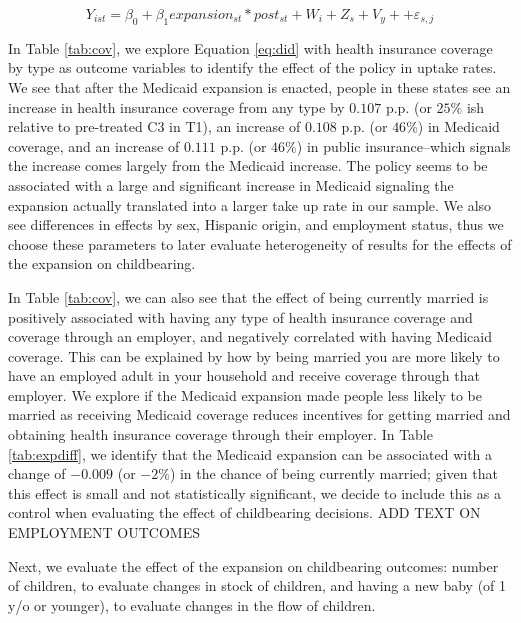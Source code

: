 \documentclass{article}
\begin{document}
\begin{equation}
    \label{eq:did}
    Y_{ist} = \beta_0 + \beta_1 expansion_{st}*post_{st} +  W_{i} + Z_{s} + V_{y}+ + \varepsilon_{s,j}
\end{equation}

In Table \ref{tab:cov}, we explore Equation \ref{eq:did} with health insurance coverage by type as outcome variables to identify the effect of the policy in uptake rates. We see that after the Medicaid expansion is enacted, people in these states see an increase in health insurance coverage from any type by $0.107$ p.p. (or $25\%$ ish relative to pre-treated  C3 in T1), an increase of $0.108$ p.p. (or $46\%$) in Medicaid coverage, and an increase of $0.111$ p.p. (or $46\%$) in public insurance--which signals the increase comes largely from the Medicaid increase. The policy seems to be associated with a large and significant increase in Medicaid signaling the expansion actually translated into a larger take up rate in our sample. We also see differences in effects by sex, Hispanic origin, and employment status, thus we choose these parameters to later evaluate heterogeneity of results for the effects of the expansion on childbearing. 

In Table \ref{tab:cov}, we can also see that the effect of being currently married is positively associated with having any type of health insurance coverage and coverage through an employer, and negatively correlated with having Medicaid coverage. This can be explained by how by being married you are more likely to have an employed adult in your household and receive coverage through that employer. We explore if the Medicaid expansion made people less likely to be married as receiving Medicaid coverage reduces incentives for getting married and obtaining health insurance coverage through their employer. In Table \ref{tab:expdiff}, we identify that the Medicaid expansion can be associated with a change of $-0.009$ (or $-2\%$) in the chance of being currently married; given that this effect is small and not statistically significant, we decide to include this as a control when evaluating the effect of childbearing decisions. ADD TEXT ON EMPLOYMENT OUTCOMES

Next, we evaluate the effect of the expansion on childbearing outcomes: number of children, to evaluate changes in stock of children, and having a new baby (of 1 y/o or younger), to evaluate changes in the flow of children. 
\end{document}
